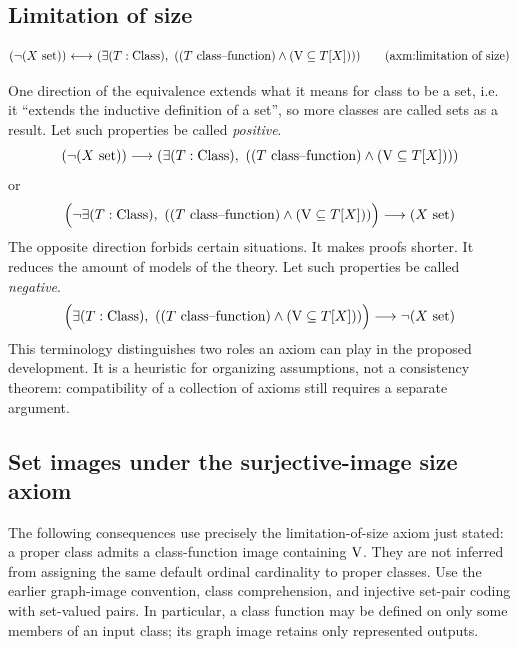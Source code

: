 \subsection{Limitation of size}
\begin{axiom}
\[
(\neg(X\set))
\iff
(
\exists (T:\Class),\ (
(T\text{ class--function})
\land
(\V\subclass T[X])
)
)
\clabeltagd{axm}{limitation of size}
\]
\end{axiom}
\begin{note}[properties]
One direction of the equivalence extends what it means for class to be a set, i.e. it ``extends the inductive definition of a set'', so more classes are called sets as a result. Let such properties be called \textit{positive}.
\[
(\neg(X\mathrm{\ set}))
\longrightarrow
(
\exists (T:{\text{Class}}),\ (
(T\text{ class--function})
\land
(\mathrm{V}\subseteq T[X])
)
)
\]
or
\[
\Big(
\neg\exists (T:{\text{Class}}),\ (
(T\text{ class--function})
\land
(\mathrm{V}\subseteq T[X])
)
\Big)
\longrightarrow
(X\mathrm{\ set})
\]
The opposite direction forbids certain situations. It makes proofs shorter. It reduces the amount of models of the theory. Let such properties be called \textit{negative}.
\[
\Big(
\exists (T:{\text{Class}}),\ (
(T\text{ class--function})
\land
(\mathrm{V}\subseteq T[X])
)
\Big)
\longrightarrow
\neg(X\mathrm{\ set})
\]
This terminology distinguishes two roles an axiom can play in the proposed development. It is a heuristic for organizing assumptions, not a consistency theorem: compatibility of a collection of axioms still requires a separate argument.
\end{note}

\subsection{Set images under the surjective-image size axiom}
The following consequences use precisely the limitation-of-size axiom
just stated: a proper class admits a class-function image containing
$\mathrm{V}$. They are not inferred from assigning the same default ordinal
cardinality to proper classes. Use the earlier graph-image convention,
class comprehension, and injective set-pair coding with set-valued pairs.
In particular, a class function may be defined on only some members
of an input class; its graph image retains only represented outputs.

